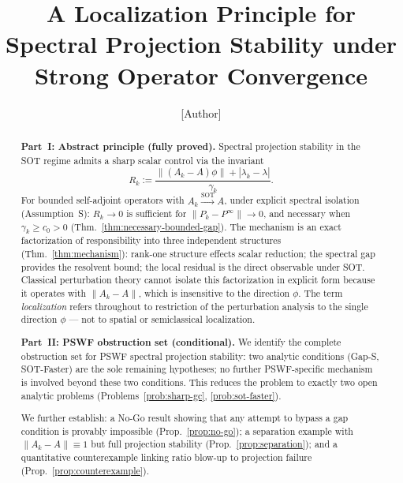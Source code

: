 \documentclass[12pt,a4paper]{amsart}
\theoremstyle{definition}
\theoremstyle{remark}
\begin{document}
\title[A Localization Principle for
  Spectral Projection Stability]{%
  A Localization Principle for Spectral
  Projection Stability under Strong
  Operator Convergence}

\author{[Author]}
\address{[Address]}
\email{[Email]}

\begin{abstract}
\textbf{Part~I: Abstract principle
  (fully proved).}
Spectral projection stability in the
SOT regime admits a sharp scalar
control via the invariant
\[
  R_k :=
  \frac{\|(A_k-A)\phi\|
  + |\lambda_k-\lambda|}{\gamma_k}.
\]
For bounded self-adjoint operators
with $A_k\xrightarrow{\mathrm{SOT}} A$,
under explicit spectral isolation
(Assumption~S):
$R_k\to 0$ is sufficient for
$\|P_k - P^\infty\|\to 0$,
and necessary when $\gamma_k\ge c_0>0$
(Thm.~\ref{thm:necessary-bounded-gap}).
The mechanism is an exact factorization
of responsibility into three
independent structures
(Thm.~\ref{thm:mechanism}):
rank-one structure effects scalar
reduction; the spectral gap provides
the resolvent bound; the local residual
is the direct observable under SOT.
Classical perturbation theory cannot
isolate this factorization in explicit
form because it operates with
$\|A_k-A\|$, which is insensitive
to the direction $\phi$.
The term \emph{localization} refers
throughout to restriction of the
perturbation analysis to the single
direction $\phi$ --- not to spatial
or semiclassical localization.

\medskip
\textbf{Part~II: PSWF obstruction
  set (conditional).}
We identify the complete obstruction
set for PSWF spectral projection
stability: two analytic conditions
(Gap-S, SOT-Faster) are the sole
remaining hypotheses; no further
PSWF-specific mechanism is involved
beyond these two conditions.
This reduces the problem to exactly
two open analytic problems
(Problems~\ref{prob:sharp-gc},
\ref{prob:sot-faster}).

\medskip
We further establish: a No-Go result
showing that any attempt to bypass
a gap condition is provably impossible
(Prop.~\ref{prop:no-go}); a separation
example with $\|A_k-A\|\equiv 1$
but full projection stability
(Prop.~\ref{prop:separation}); and a
quantitative counterexample linking
ratio blow-up to projection failure
(Prop.~\ref{prop:counterexample}).
\end{abstract}

\maketitle
\end{document}
